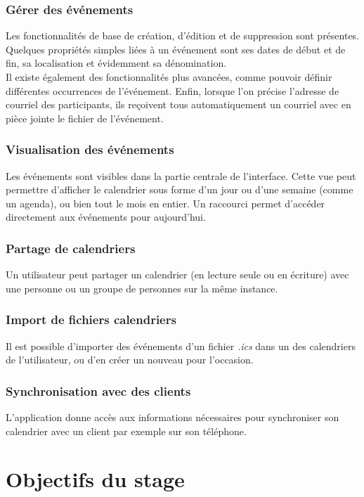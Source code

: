 \documentclass[10pt,a4paper, twoside]{report}
\begin{document}
	\subsubsection{Gérer des événements}
	Les fonctionnalités de base de création, d'édition et de suppression sont présentes. Quelques propriétés simples liées à un événement sont ses dates de début et de fin, sa localisation et évidemment sa dénomination.
	\\
	
	Il existe également des fonctionnalités plus avancées, comme pouvoir définir différentes occurrences de l'événement. Enfin, lorsque l'on précise l'adresse de courriel des participants, ils reçoivent tous automatiquement un courriel avec en pièce jointe le fichier de l'événement.
	
	\subsubsection{Visualisation des événements}
	Les événements sont visibles dans la partie centrale de l'interface. Cette vue peut permettre d'afficher le calendrier sous forme d'un jour ou d'une semaine (comme un agenda), ou bien tout le mois en entier. Un raccourci permet d'accéder directement aux événements pour aujourd’hui.
	
	\subsubsection{Partage de calendriers}
	Un utilisateur peut partager un calendrier (en lecture seule ou en écriture) avec une personne ou un groupe de personnes sur la même instance.
	
	\subsubsection{Import de fichiers calendriers}
	Il est possible d'importer des événements d'un fichier \textit{.ics} dans un des calendriers de l'utilisateur, ou d'en créer un nouveau pour l'occasion.
	
	\subsubsection{Synchronisation avec des clients}
	L'application donne accès aux informations nécessaires pour synchroniser son calendrier avec un client par exemple sur son téléphone.
	
	\section{Objectifs du stage}
	
\end{document}
